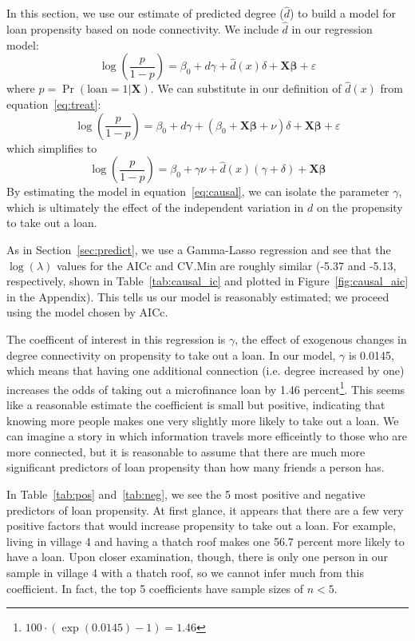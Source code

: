 \documentclass[11pt, fleqn]{article}
\begin{document}
In this section, we use our estimate of predicted degree ($\hat{d}$) to build a model for loan propensity based on node connectivity. We include $\hat{d}$ in our regression model:
\begin{equation} \label{eq:causal}
\log\left(\frac{p}{1-p}\right) = \beta_0 + d \gamma + \hat{d}(x) \delta + \bm{X}\bm{\beta} + \varepsilon
\end{equation}
where $p = \Pr(\text{loan}=1|\bm{X})$. We can substitute in our definition of $\hat{d}(x)$ from equation~\ref{eq:treat}:
\begin{equation}
\log\left(\frac{p}{1-p}\right) = \beta_0 + d \gamma + \left(\beta_0 + \bm{X} \bm{\beta} + \nu\right) \delta + \bm{X}\bm{\beta} + \varepsilon
\end{equation}
which simplifies to
\begin{equation}
\log\left(\frac{p}{1-p}\right) = \beta_0 + \gamma \nu + \hat{d}(x) (\gamma + \delta) + \bm{X}\bm{\beta}
\end{equation}
By estimating the model in equation~\ref{eq:causal}, we can isolate the parameter $\gamma$, which is ultimately the effect of the independent variation in $d$ on the propensity to take out a loan. 

As in Section~\ref{sec:predict}, we use a Gamma-Lasso regression and see that the $\log(\lambda)$ values for the AICc and CV.Min are roughly similar (-5.37 and -5.13, respectively, shown in Table~\ref{tab:causal_ic} and plotted in Figure~\ref{fig:causal_aic} in the Appendix). This tells us our model is reasonably estimated; we proceed using the model chosen by AICc.

The coefficent of interest in this regression is $\gamma$, the effect of exogenous changes in degree connectivity on propensity to take out a loan. In our model, $\gamma$ is 0.0145, which means that having one additional connection (i.e. degree increased by one) increases the odds of taking out a microfinance loan by 1.46 percent\footnote{$100 \cdot \left( \exp(0.0145) - 1 \right) = 1.46$}. This seems like a reasonable estimate \textemdash the coefficient is small but positive, indicating that knowing more people makes one very slightly more likely to take out a loan. We can imagine a story in which information travels more efficeintly to those who are more connected, but it is reasonable to assume that there are much more significant predictors of loan propensity than how many friends a person has.

In Table~\ref{tab:pos} and~\ref{tab:neg}, we see the 5 most positive and negative predictors of loan propensity. At first glance, it appears that there are a few very positive factors that would increase propensity to take out a loan. For example, living in village 4 and having a thatch roof makes one 56.7 percent more likely to have a loan. Upon closer examination, though, there is only one person in our sample in village 4 with a thatch roof, so we cannot infer much from this coefficient. In fact, the top 5 coefficients have sample sizes of $n<5$.
\end{document}
